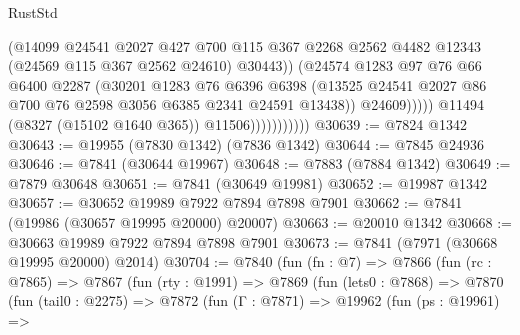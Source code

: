 \begin{lexlean}{RustStd}
\begin{coremodule}
                                    (@14099
                                      @24541
                                      @2027
                                      @427
                                      @700
                                      @115
                                      @367
                                      @2268
                                      @2562
                                      @4482
                                      @12343
                                      (@24569 @115 @367 @2562 @24610)
                                      @30443))
                                  (@24574
                                    @1283
                                    @97
                                    @76
                                    @66
                                    @6400
                                    @2287
                                    (@30201
                                      @1283
                                      @76
                                      @6396
                                      @6398
                                      (@13525
                                        @24541
                                        @2027
                                        @86
                                        @700
                                        @76
                                        @2598
                                        @3056
                                        @6385
                                        @2341
                                        @24591
                                        @13438))
                                    @24609)))))
                          @11494
                          (@8327 (@15102 @1640 @365))
                          @11506)))))))))))
@30639 := @7824 @1342
@30643 := @19955 (@7830 @1342) (@7836 @1342)
@30644 := @7845 @24936
@30646 := @7841 (@30644 @19967)
@30648 := @7883 (@7884 @1342)
@30649 := @7879 @30648
@30651 := @7841 (@30649 @19981)
@30652 := @19987 @1342
@30657 := @30652 @19989 @7922 @7894 @7898 @7901
@30662 := @7841 (@19986 (@30657 @19995 @20000) @20007)
@30663 := @20010 @1342
@30668 := @30663 @19989 @7922 @7894 @7898 @7901
@30673 := @7841 (@7971 (@30668 @19995 @20000) @2014)
@30704 := @7840
    (fun (fn : @7) =>
    @7866
      (fun (rc : @7865) =>
      @7867
        (fun (rty : @1991) =>
        @7869
          (fun (lets0 : @7868) =>
          @7870
            (fun (tail0 : @2275) =>
            @7872
              (fun (Γ : @7871) =>
              @19962
                (fun (ps : @19961) =>

\end{coremodule}
\end{lexlean}
